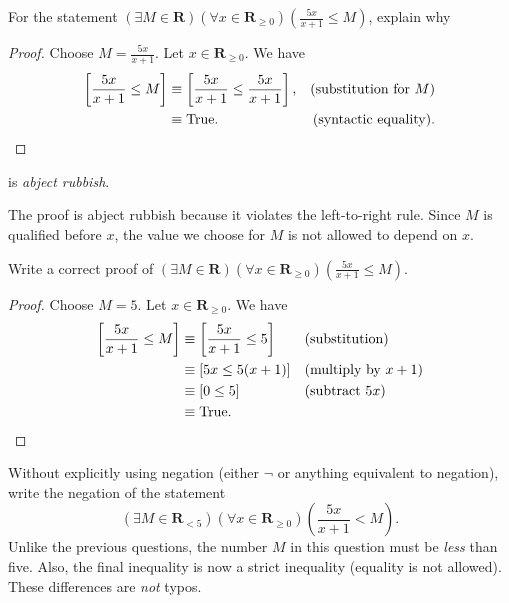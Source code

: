 \documentclass[12pt,fleqn,answers]{exam}
\newcommand{\reals}{\mathbf{R}}
\newcommand{\true}{\mathrm{True}}
\begin{document}
\begin{questions}

\question[10] For the statement  \(\left(\exists M \in \reals  \right)
\left(\forall x \in \reals_{\geq 0} \right) \left(\frac{5 x}{x+1} \leq M \right)\), explain why

\begin{proof} Choose $M = \frac{5 x}{x+1}$. Let  $x \in \reals_{\geq 0}$. We have
\begin{align*}
 \left[\frac{5 x}{x+1} \leq M  \right] &\equiv
 \left[\frac{5 x}{x+1} \leq  \frac{5 x}{x+1}  \right],  &\mbox{(substitution for $M$)} \\
 &\equiv \mbox{True}. &\mbox{(syntactic equality)}. 
 \qedhere
\end{align*}
\end{proof}
is \emph{abject rubbish}.

\begin{solution} The proof is abject rubbish because it violates
  the left-to-right rule.  Since $M$ is qualified before $x$,
  the value we choose for $M$ is not allowed to depend on $x$.

\end{solution}

\question[10] Write a correct proof of \(\left(\exists M \in \reals\right)
\left(\forall x \in \reals_{\geq 0} \right) \left(\frac{5 x}{x+1} \leq  M \right)\).

\begin{proof} Choose $M = 5$. Let $x \in \reals_{\geq 0}$. 
  We have
  \begin{align*}
     \left[\frac{5 x}{x+1} \leq  M \right] 
       &\equiv \left[\frac{5 x}{x+1} \leq  5 \right] &&\text{(substitution)} \\
       &\equiv \left[5 x \leq  5 (x+1) \right] &&\text{(multiply by $x+1$)} \\
       &\equiv \left[ 0 \leq 5 \right] &&\text{(subtract $5 x$)} \qedhere \\
       &\equiv \true.
  \end{align*}

\end{proof}
\question [10]  Without explicitly using negation (either $\lnot$ or anything equivalent to negation), write the negation of the statement
\begin{equation*}
\left(\exists M \in  \reals_{< 5} \right)
\left(\forall x \in  \reals_{\geq 0} \right) \left(\frac{5 x}{x+1} <  M \right).
\end{equation*}
Unlike the previous questions, the number $M$ in this question must be \emph{less} than five. Also,
the final inequality is now a strict inequality (equality is not allowed). These differences are \emph{not} typos.


\end{questions}
\end{document}
